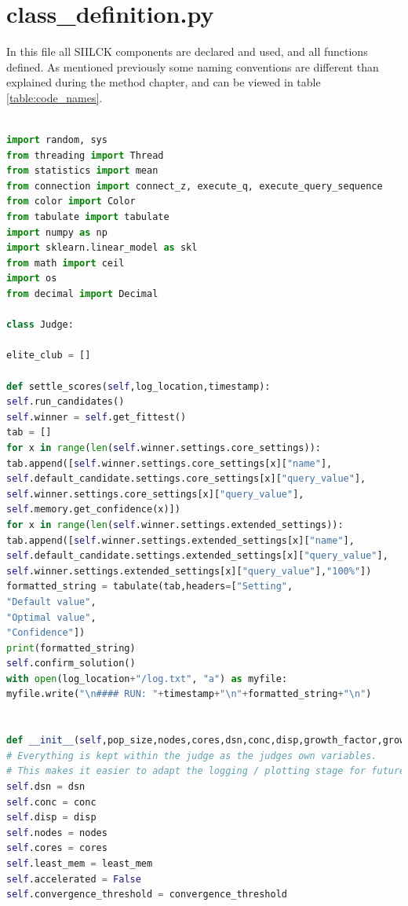 \documentclass[a4paper,english]{report}
\begin{document}
\section{class\_definition.py}
In this file all SIILCK components are declared and used, and all functions defined. As mentioned previously some naming conventions are different than explained during the method chapter, and can be viewed in table \ref{table:code_names}.
\begin{lstlisting}[language=Python, caption=class\_definition.py\, the file defining all the algorithmic operations done during a optimization process.]

import random, sys
from threading import Thread
from statistics import mean
from connection import connect_z, execute_q, execute_query_sequence
from color import Color
from tabulate import tabulate
import numpy as np
import sklearn.linear_model as skl
from math import ceil
import os
from decimal import Decimal

class Judge:

elite_club = []

def settle_scores(self,log_location,timestamp):
self.run_candidates()
self.winner = self.get_fittest()
tab = []
for x in range(len(self.winner.settings.core_settings)):
tab.append([self.winner.settings.core_settings[x]["name"],
self.default_candidate.settings.core_settings[x]["query_value"],
self.winner.settings.core_settings[x]["query_value"],
self.memory.get_confidence(x)])
for x in range(len(self.winner.settings.extended_settings)):
tab.append([self.winner.settings.extended_settings[x]["name"],
self.default_candidate.settings.extended_settings[x]["query_value"],
self.winner.settings.extended_settings[x]["query_value"],"100%"])
formatted_string = tabulate(tab,headers=["Setting",
"Default value",
"Optimal value",
"Confidence"])
print(formatted_string)
self.confirm_solution()
with open(log_location+"/log.txt", "a") as myfile:
myfile.write("\n#### RUN: "+timestamp+"\n"+formatted_string+"\n")


def __init__(self,pop_size,nodes,cores,dsn,conc,disp,growth_factor,growth_chance,resistance,convergence_threshold,elite_club_size,elites_each_run,least_mem):
# Everything is kept within the judge as the judges own variables.
# This makes it easier to adapt the logging / plotting stage for future work.
self.dsn = dsn
self.conc = conc
self.disp = disp
self.nodes = nodes
self.cores = cores
self.least_mem = least_mem
self.accelerated = False
self.convergence_threshold = convergence_threshold 


\end{lstlisting}
\end{document}
